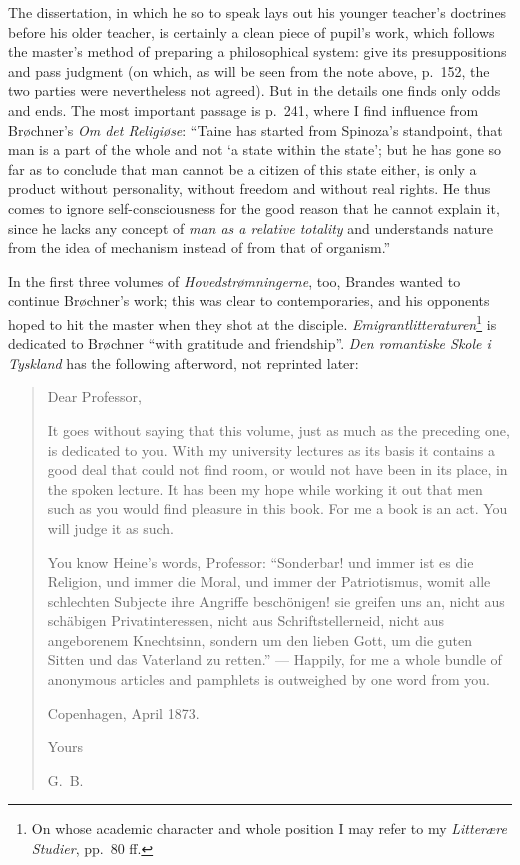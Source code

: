 \documentclass[12pt,a4paper,openany]{book}
\newcommand{\opage}[1]{\marginnote{\footnotesize\textit{[#1]}}}
\begin{document}
The dissertation, in which he so to speak lays out his younger teacher's doctrines before his older teacher, is
certainly a clean piece of pupil's work, which follows the master's method of preparing a philosophical system:
give its presuppositions and pass judgment (on which, as will be seen from the note above, p.~152, the two parties
were nevertheless not agreed). But in the details one finds only odds and ends. The most important passage is
p.~241, where I find influence from Brøchner's \textit{Om det Religiøse}: ``Taine has started from Spinoza's
standpoint, that man is a part of the whole and not `a state within the state'; but
\opage{158}\setcounter{footnote}{0}%
he has gone so far as to conclude that man cannot be a citizen of this state either, is only a product without
personality, without freedom and without real rights. He thus comes to ignore self-consciousness for the good
reason that he cannot explain it, since he lacks any concept of \textit{man as a relative totality} and understands
nature from the idea of mechanism instead of from that of organism.''

In the first three volumes of \textit{Hovedstrømningerne}, too, Brandes wanted to continue Brøchner's work; this
was clear to contemporaries, and his opponents hoped to hit the master when they shot at the disciple.
\textit{Emigrantlitteraturen}\footnote{On whose academic character and whole position I may refer to my
\textit{Litterære Studier}, pp.~80 ff.} is dedicated to Brøchner ``with gratitude and friendship''. \textit{Den
romantiske Skole i Tyskland} has the following afterword, not reprinted later:

\medskip

\begin{quote}\small

Dear Professor,

\medskip

It goes without saying that this volume, just as much as the preceding one, is dedicated to you. With my
university lectures as its basis it contains a good deal that could not find room, or would not have been in its
place, in the spoken lecture. It has been my hope while working it out that men such as you would find pleasure in
this book. For me a book is an act. You will judge it as such.

You know Heine's words, Professor: ``Sonderbar! und immer ist es die Religion, und immer die Moral, und immer der
Patriotismus, womit alle schlechten Subjecte ihre Angriffe beschönigen! sie greifen uns an, nicht aus schäbigen
Privatinteressen, nicht aus Schriftstellerneid, nicht aus angeborenem Knechtsinn, sondern um den lieben Gott, um
die guten Sitten und das Vaterland zu retten.'' --- Happily, for me a whole bundle of anonymous articles and
pamphlets is outweighed by one word from you.
\par\hfill Copenhagen, April 1873.\par\hfill Yours\par\hfill G.~B.

\medskip

\end{quote}
\end{document}

